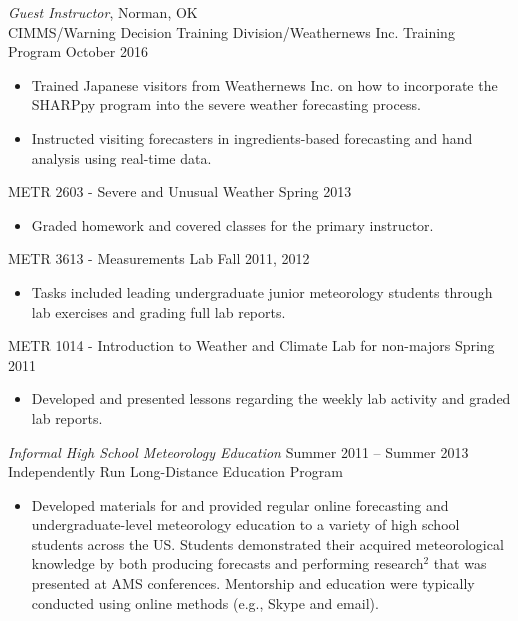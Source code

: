 \documentclass[10pt]{res} %
\begin{document}
\begin{resume}
{\sl Guest Instructor}, Norman, OK \\[2pt]
CIMMS/Warning Decision Training Division/Weathernews Inc. Training Program  \hfill October 2016
\begin{itemize} \itemsep 2pt %
\item Trained Japanese visitors from Weathernews Inc. on how to incorporate the SHARPpy program into the severe weather forecasting process.
\item Instructed visiting forecasters in ingredients-based forecasting and hand analysis using real-time data.
\end{itemize}

METR 2603 - Severe and Unusual Weather \hfill Spring 2013
\begin{itemize} \itemsep 2pt %
\item Graded homework and covered classes for the primary instructor.
\end{itemize}

METR 3613 - Measurements Lab \hfill Fall 2011, 2012 
\begin{itemize} \itemsep 2pt %
\item Tasks included leading undergraduate junior meteorology students through lab exercises and grading full lab reports.  
\end{itemize}

METR 1014 - Introduction to Weather and Climate Lab for non-majors \hfill Spring 2011
\begin{itemize} \itemsep 2pt %
\item Developed and presented lessons regarding the weekly lab activity and graded lab reports.
\end{itemize}

{\sl  Informal High School Meteorology Education}  \hfill Summer 2011 -- Summer 2013 \\
Independently Run Long-Distance Education Program
\begin{itemize} \itemsep 2pt %
\item Developed materials for and provided regular online forecasting and undergraduate-level meteorology education to a variety of high school students across the US.  Students demonstrated their acquired meteorological knowledge by both producing forecasts and performing research$^{2}$ that was presented at AMS conferences.  Mentorship and education were typically conducted using online methods (e.g., Skype and email).
\end{itemize} 


\end{resume}
\end{document}
